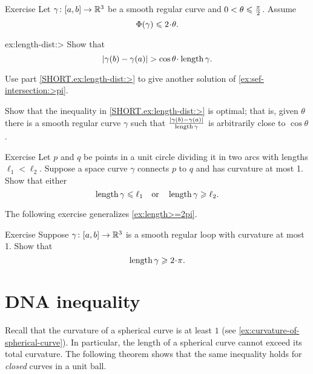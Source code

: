 \begin{thm}{Exercise}\label{ex:length-dist}
Let $\gamma\colon[a,b]\to \mathbb{R}^3$ be a smooth regular curve and $0\z<\theta\z\le\tfrac\pi2$.
Assume 
\[\tc\gamma\le 2\cdot\theta.\]

\begin{subthm}{ex:length-dist:>} Show that
\[|\gamma(b)-\gamma(a)|> \cos\theta\cdot\length\gamma.\]
\end{subthm}

\begin{subthm}{} Use part \ref{SHORT.ex:length-dist:>} to give another solution of \ref{ex:sef-intersection:>pi}.
\end{subthm}

\begin{subthm}{} Show that the inequality in \ref{SHORT.ex:length-dist:>} is optimal; that is, given 
$\theta$ there is a smooth regular curve $\gamma$ such that $\frac{|\gamma(b)-\gamma(a)|}{\mathop{\rm length}\nolimits\gamma}$ is arbitrarily close to $\cos\theta$.
\end{subthm}

\end{thm}



\begin{thm}{Exercise}\label{ex:schwartz}
Let $p$ and $q$ be points in a unit circle dividing it in two arcs with lengths $\ell_1<\ell_2$.
Suppose a space curve $\gamma$ connects $p$ to $q$ and has curvature at most 1. Show that either
\[\mathop{\rm length}\nolimits \gamma\leqslant \ell_1
\quad\text{or}\quad
\mathop{\rm length}\nolimits \gamma\geqslant \ell_2.
\]
\end{thm} %

The following exercise generalizes \ref{ex:length>=2pi}.

\begin{thm}{Exercise}\label{ex:loop}
Suppose $\gamma\colon[a,b]\to \mathbb{R}^3$ is a smooth regular loop with curvature at most 1.
Show that 
\[\length\gamma\ge2\cdot\pi.\]

\end{thm}


\section{DNA inequality}

Recall that the curvature of a spherical curve is at least $1$
(see \ref{ex:curvature-of-spherical-curve}).
In particular, the length of a spherical curve cannot exceed its total curvature.
The following theorem shows that the same inequality holds for {}\emph{closed} curves in a unit ball.

